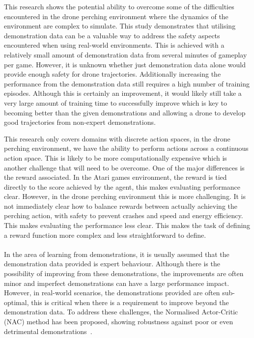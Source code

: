 This research shows the potential ability to overcome some of the difficulties encountered in the drone perching environment where the dynamics of the environment are complex to simulate.
This study demonstrates that utilising demonstration data can be a valuable way to address the safety aspects encountered when using real-world environments.
This is achieved with a relatively small amount of demonstration data from several minutes of gameplay per game.
However, it is unknown whether just demonstration data alone would provide enough safety for drone trajectories.
Additionally increasing the performance from the demonstration data still requires a high number of training episodes.
Although this is certainly an improvement, it would likely still take a very large amount of training time to successfully improve which is key to becoming better than the given demonstrations and allowing a drone to develop good trajectories from non-expert demonstrations.

This research only covers domains with discrete action spaces, in the drone perching environment, we have the ability to perform actions across a continuous action space.
This is likely to be more computationally expensive which is another challenge that will need to be overcome.
One of the major differences is the reward associated.
In the Atari games environment, the reward is tied directly to the score achieved by the agent, this makes evaluating performance clear.
However, in the drone perching environment this is more challenging.
It is not immediately clear how to balance rewards between actually achieving the perching action, with safety to prevent crashes and speed and energy efficiency.
This makes evaluating the performance less clear.
This makes the task of defining a reward function more complex and less straightforward to define. \\\\

In the area of learning from demonstrations, it is usually assumed that the demonstration data provided is expert behaviour.
Although there is the possibility of improving from these demonstrations, the improvements are often minor and imperfect demonstrations can have a large performance impact.
However, in real-world scenarios, the demonstrations provided are often sub-optimal, this is critical when there is a requirement to improve beyond the demonstration data.
To address these challenges, the Normalised Actor-Critic (NAC) method has been proposed, showing robustness against poor or even detrimental demonstrations~\cite{fyp14-rl-imperfect-demos}.

